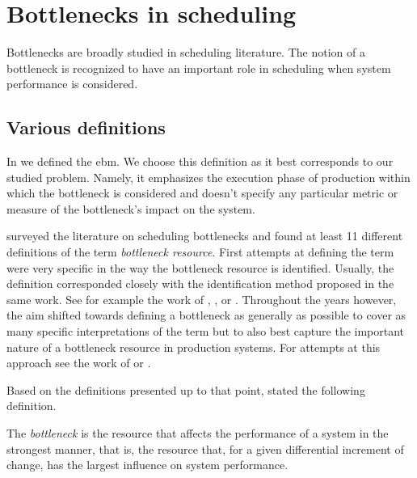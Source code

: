 \section{Bottlenecks in scheduling} \label{sec:related-works/bottlenecks-in-scheduling}

Bottlenecks are broadly studied in scheduling literature.
The notion of a bottleneck is recognized to have an important role in scheduling when system performance is considered.

\subsection{Various definitions} \label{subsec:related-works/bottlenecks-in-scheduling/various-definitions}

In  we defined the \acf{ebm}.
We choose this definition as it best corresponds to our studied problem.
Namely, it emphasizes the execution phase of production within which the bottleneck is considered
and doesn't specify any particular metric or measure of the bottleneck's impact on the system.

\citet{Betterton2012} surveyed the literature on scheduling bottlenecks and found
at least 11 different definitions of the term \emph{bottleneck resource}.
First attempts at defining the term were very specific in the way the bottleneck resource is identified.
Usually, the definition corresponded closely with the identification method proposed in the same work.
See for example the work of \citet{Lawrence1994}, \citet{Kuo1996}, or \citet{Roser2001}.
Throughout the years however, the aim shifted towards defining a bottleneck as generally as possible
to cover as many specific interpretations of the term
but to also best capture the important nature of a bottleneck resource in production systems.
For attempts at this approach see the work of \citet{Chiang2001} or \citet{Biller2010}.

Based on the definitions presented up to that point,
\citet{Betterton2012} stated the following definition.

\begin{defn*} \label{def:bottleneck-general}
    The \emph{bottleneck} is the resource that affects the performance of a system in the strongest manner, that is,
    the resource that, for a given differential increment of change, has the largest influence on system performance.
\end{defn*}


